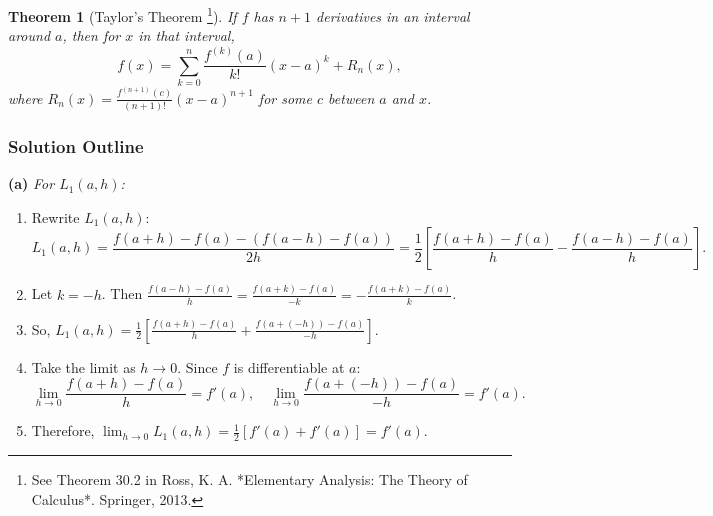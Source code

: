 \documentclass{article}
\newtheorem*{theorem}{Theorem}
\begin{document}
\begin{theorem}[Taylor's Theorem \footnote{See Theorem 30.2 in Ross, K. A. *Elementary Analysis: The Theory of Calculus*. Springer, 2013.}]
If \(f\) has \(n+1\) derivatives in an interval around \(a\), then for \(x\) in that interval,
\[ f(x) = \sum_{k=0}^n \frac{f^{(k)}(a)}{k!} (x-a)^k + R_n(x), \]
where \(R_n(x) = \frac{f^{(n+1)}(c)}{(n+1)!}(x-a)^{n+1}\) for some \(c\) between \(a\) and \(x\).
\end{theorem}

\subsubsection*{Solution Outline}

\textbf{(a)}
\textit{For \(L_1(a,h)\):}
\begin{enumerate}
    \item Rewrite \(L_1(a,h)\):
    \[ L_1(a,h) = \frac{f(a+h) - f(a) - (f(a-h) - f(a))}{2h} = \frac{1}{2} \left[ \frac{f(a+h) - f(a)}{h} - \frac{f(a-h) - f(a)}{h} \right]. \]
    \item Let \(k = -h\). Then \(\frac{f(a-h) - f(a)}{h} = \frac{f(a+k) - f(a)}{-k} = -\frac{f(a+k) - f(a)}{k}\).
    \item So, \(L_1(a,h) = \frac{1}{2} \left[ \frac{f(a+h) - f(a)}{h} + \frac{f(a+(-h)) - f(a)}{-h} \right]\).
    \item Take the limit as \(h \to 0\). Since \(f\) is differentiable at \(a\):
    \[ \lim_{h \to 0} \frac{f(a+h) - f(a)}{h} = f'(a), \quad \lim_{h \to 0} \frac{f(a+(-h)) - f(a)}{-h} = f'(a). \]
    \item Therefore, \(\lim_{h \to 0} L_1(a,h) = \frac{1}{2} [f'(a) + f'(a)] = f'(a)\).
\end{enumerate}
\end{document}

